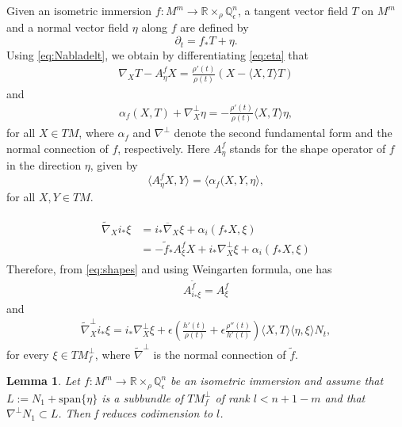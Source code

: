 \documentclass[10pt,a4paper]{amsart}
\newtheorem{lem}{Lemma}
\newcommand{\Q}{\mathbb{Q}}
\newcommand{\R}{\mathbb{R}}
\newcommand{\Span}{\text{span}}
\newcommand{\WP}{\R\times_{\rho}\Q^n_{\epsilon}}
\newcommand{\al}{\alpha}
\newcommand{\co}{\colon}
\newcommand{\e}{\epsilon}
\newcommand{\nb}{\overline\nabla}
\newcommand{\np}{\nabla^\perp}
\newcommand{\nt}{\widetilde\nabla}
\newcommand{\pid}{\rangle}
\newcommand{\pie}{\langle}
\begin{document}
Given an isometric immersion $f\co M^m\to\WP$, a tangent vector field $T$ on $M^m$ and a normal vector field $\eta$ along $f$ are defined by
\begin{equation} \label{eq:eta}
\partial_t= f_{\ast} T+\eta.    
\end{equation}
Using \eqref{eq:Nabladelt}, we obtain by differentiating \eqref{eq:eta} that
\begin{eqnarray} \label{eq:derT}
\nabla_XT - A^f_\eta X = \frac{\rho'(t)}{\rho(t)}
\left(X-\langle X,T\rangle T\right)
\end{eqnarray}
and
\begin{eqnarray} \label{eq:dereta}
\al_f(X,T) + \nabla^{\perp}_X\eta = -\frac{\rho'(t)}{\rho(t)}
\langle X,T\rangle\eta,
\end{eqnarray}
for all $X\in TM$, where $\alpha_f$ and $\np$ denote the second fundamental form and the normal connection of $f$, respectively. Here $A^f_\eta$ stands for the shape operator of $f$ in the
direction $\eta$, given by
\[
\pie A^f_\eta X,Y\pid = \pie\al_f(X,Y,\eta\pid,
\]
for all $X,Y\in TM$.

\begin{eqnarray} \label{eq:shapes}
\begin{aligned}
\nt_Xi_\ast\xi &= i_\ast\nb_X\xi + \alpha_i(f_\ast X,\xi) \\
& = -\tilde{f}_\ast A^f_{\xi}X + i_\ast\np_X\xi+ \alpha_i(f_\ast X,\xi)
\end{aligned}
\end{eqnarray}
Therefore, from \eqref{eq:shapes} and using Weingarten formula, one has
\begin{eqnarray} \label{eq:A^fA^tf}
A^{\tilde f}_{i_{\ast}\xi}=A^f_{\xi}
\end{eqnarray}
and
\begin{eqnarray} \label{eq:nabtilperp}
\widetilde{\nabla}^{\perp}_{X} i_{\ast} \xi=  i_\ast\np_X\xi+ \e\left(\frac{h'(t)}{\rho(t)}+\e\frac{\rho''(t)}{h'(t)}\right)\langle X, T\rangle \langle\eta,\xi\rangle N_t,
\end{eqnarray}
for every $\xi\in TM^\perp_f$, where $\widetilde{\nabla}^{\perp}$ is the normal connection of $\tilde{f}$. 

\begin{lem} \label{lem:RedCodim}
Let $f\co M^m\to\WP$ be an isometric immersion and assume that $L:= N_{1}+\Span\{\eta\}$ is a subbundle of $TM^\perp_f$ of rank $l<n+1-m$ and that $\nabla^{\perp}N_1\subset L$. Then f reduces codimension to $l$.
\end{lem}
\end{document}
